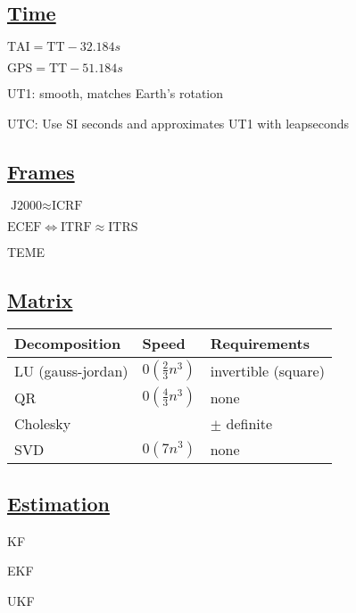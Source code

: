 \documentclass[11pt,landscape]{article}
\begin{document}
\subsection{\underline{Time}}

$\text{TAI} = \text{TT} - 32.184s$

$\text{GPS} = \text{TT} - 51.184s$

UT1: smooth, matches Earth's rotation

UTC: Use SI seconds and approximates UT1 with leapseconds


\subsection{\underline{Frames}}

$\text{J2000} \approx \text{ICRF}$

$\text{ECEF} \Leftrightarrow \text{ITRF} \approx \text{ITRS}$

TEME


\subsection{\underline{Matrix}}

\begin{tabular}{ l l l }
Decomposition & Speed & Requirements \\
\hline
LU (gauss-jordan) & $0(\frac{2}{3}n^3)$ & invertible (square) \\ 
QR & $0(\frac{4}{3}n^3)$ & none \\  
Cholesky &  & $\pm$ definite \\
SVD & $0(7n^3)$ & none    
\end{tabular}


\newpage

\subsection{\underline{Estimation}}

KF

EKF

UKF

\scriptsize


\end{document}
